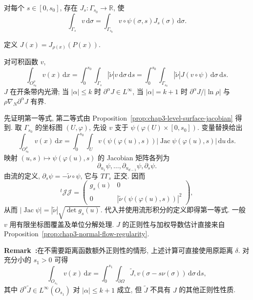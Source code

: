 \begin{Proposition}
\label{prop:chap3-level-surface-jacobian}
对每个 $s\in[0,s_0]$, 存在 $J_s:\Gamma_{s_0}\to\mathbb R$, 使
\[
 \int_{\Gamma_s}v\,\mathrm d\sigma
 =\int_{\Gamma_{s_0}}v\circ\psi(\sigma,s)J_s(\sigma)\,\mathrm d\sigma.
\]
\end{Proposition}

\begin{Definition}
\label{def:chap3-boundary-strip-jacobian}
定义 $J(x)=J_{\rho(x)}(P(x))$.
\end{Definition}

\begin{Proposition}
\label{prop:chap3-boundary-strip-change-variables}
对可积函数 $v$,
\[
 \int_{O_{s_0}^\rho}v(x)\,\mathrm dx
 =\int_0^{s_0}\int_{\Gamma_s}|\widetilde\nu|v\,\mathrm d\sigma\,\mathrm ds
 =\int_0^{s_0}\int_{\Gamma_{s_0}}|\widetilde\nu|J(v\circ\psi)\,\mathrm d\sigma\,\mathrm ds.
\]
$J$ 在开条带内光滑; 当 $|\alpha|\leq k$ 时 $\partial^\alpha J\in L^\infty$, 当 $|\alpha|=k+1$ 时 $\partial^\alpha J/|\ln\rho|$ 与 $\rho\nabla_N\partial^\alpha J$ 有界.
\end{Proposition}

\begin{Proof}
先证明第一等式, 第二等式由 Proposition~\ref{prop:chap3-level-surface-jacobian} 得到. 取 $\Gamma_{s_0}$ 的坐标图 $(U,\varphi)$, 先设 $v$ 支于 $\psi(\varphi(U)\times[0,s_0])$. 变量替换给出
\[
 \int_{O_{s_0}^\rho}v(x)\,\mathrm dx
 =\int_0^{s_0}\int_Uv(\psi(\varphi(u),s))
 |\operatorname{Jac}\psi(\varphi(u),s)|\,\mathrm du\,\mathrm ds.
\]
映射 $(u,s)\mapsto\psi(\varphi(u),s)$ 的 Jacobian 矩阵各列为
\[
 \partial_{u_1}\psi,\ldots,\partial_{u_{d-1}}\psi,\partial_s\psi.
\]
由流的定义, $\partial_s\psi=-\widetilde\nu\circ\psi$, 它与 $T\Gamma_s$ 正交. 因而
\[
 {}^t\mathcal J\mathcal J=
 \begin{pmatrix}g_s(u)&0\\0&|\widetilde\nu(\psi(\varphi(u),s))|^2\end{pmatrix},
 \]
从而 $|\operatorname{Jac}\psi|=|\widetilde\nu|\sqrt{\det g_s(u)}$. 代入并使用流形积分的定义即得第一等式. 一般 $v$ 用有限坐标图覆盖及单位分解处理. $J$ 的正则性与加权导数估计直接来自 Proposition~\ref{prop:chap3-normal-flow-regularity}.
\end{Proof}

\par\noindent{}\textbf{Remark~\thechapterthreesectionthreeremark:}\label{rem:chap3-original-distance-alternative}\quad 在不需要距离函数额外正则性的情形, 上述计算可直接使用原距离 $\delta$. 对充分小的 $s_1>0$ 可得
\[
 \int_{O_{s_1}}v(x)\,\mathrm dx
 =\int_0^{s_1}\int_{\partial\Omega}
 \widetilde J,v(\sigma-s\nu(\sigma))\,\mathrm d\sigma\,\mathrm ds,
\]
其中 $\partial^\alpha\widetilde J\in L^\infty(O_{s_1})$ 对 $|\alpha|\leq k+1$ 成立, 但 $\widetilde J$ 不具有 $J$ 的其他正则性性质.

